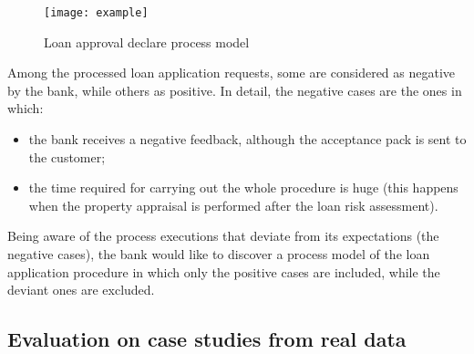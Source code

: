 \begin{figure}[t]
\centering
\texttt{[image: example]}
\caption{Loan approval declare process model }
\label{fig:ex}
\end{figure}

Among the processed loan application requests, some are considered as negative by the bank, while others as positive. In detail, the negative cases are the ones in which:
\begin{itemize}
\item the bank receives a negative feedback, although the acceptance pack is sent to the customer;
\item the time required for carrying out the whole procedure is huge (this happens when the property appraisal is performed after the loan risk assessment).
\end{itemize}

Being aware of the process executions that deviate from its expectations (the negative cases), the bank would like to discover a process model of the loan application procedure in which only the positive cases are included, while the deviant ones are excluded.


\subsection{Evaluation on case studies from real data}
\label{sec:realdata}



